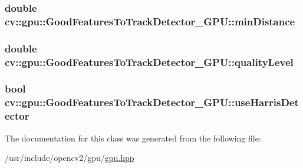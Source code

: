 \hypertarget{classcv_1_1gpu_1_1GoodFeaturesToTrackDetector__GPU_af0ea46c4aec5a06aece948dba21b17c3}{
\subsubsection[{min\-Distance}]{\setlength{\rightskip}{0pt plus 5cm}double cv\-::gpu\-::\-Good\-Features\-To\-Track\-Detector\-\_\-\-G\-P\-U\-::min\-Distance}}\label{classcv_1_1gpu_1_1GoodFeaturesToTrackDetector__GPU_af0ea46c4aec5a06aece948dba21b17c3}
\hypertarget{classcv_1_1gpu_1_1GoodFeaturesToTrackDetector__GPU_a9f5f8a99c745336967c83605ab01adf4}{
\subsubsection[{quality\-Level}]{\setlength{\rightskip}{0pt plus 5cm}double cv\-::gpu\-::\-Good\-Features\-To\-Track\-Detector\-\_\-\-G\-P\-U\-::quality\-Level}}\label{classcv_1_1gpu_1_1GoodFeaturesToTrackDetector__GPU_a9f5f8a99c745336967c83605ab01adf4}
\hypertarget{classcv_1_1gpu_1_1GoodFeaturesToTrackDetector__GPU_a5ae93a396eeb8eb0978026d57b14acea}{
\subsubsection[{use\-Harris\-Detector}]{\setlength{\rightskip}{0pt plus 5cm}bool cv\-::gpu\-::\-Good\-Features\-To\-Track\-Detector\-\_\-\-G\-P\-U\-::use\-Harris\-Detector}}\label{classcv_1_1gpu_1_1GoodFeaturesToTrackDetector__GPU_a5ae93a396eeb8eb0978026d57b14acea}


The documentation for this class was generated from the following file\-:\begin{DoxyCompactItemize}
\item 
/usr/include/opencv2/gpu/\hyperlink{gpu_2gpu_8hpp}{gpu.\-hpp}\end{DoxyCompactItemize}
